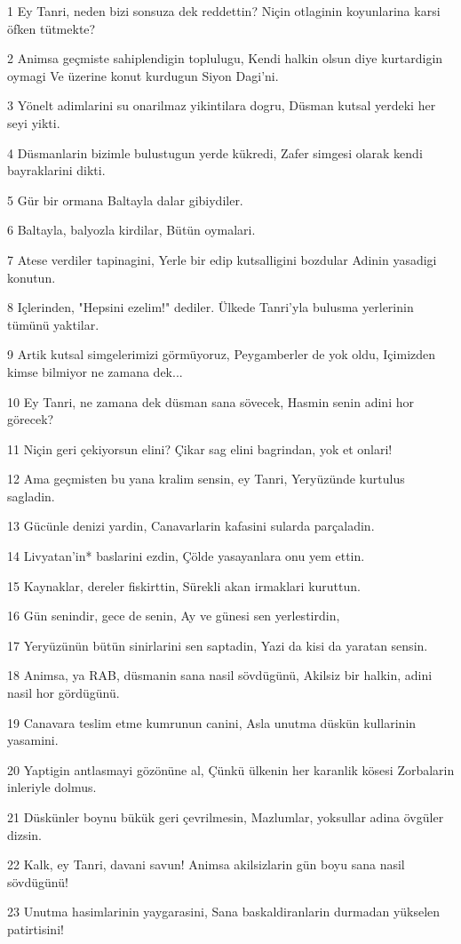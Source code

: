 \par 1 Ey Tanri, neden bizi sonsuza dek reddettin? Niçin otlaginin koyunlarina karsi öfken tütmekte?
\par 2 Animsa geçmiste sahiplendigin toplulugu, Kendi halkin olsun diye kurtardigin oymagi Ve üzerine konut kurdugun Siyon Dagi'ni.
\par 3 Yönelt adimlarini su onarilmaz yikintilara dogru, Düsman kutsal yerdeki her seyi yikti.
\par 4 Düsmanlarin bizimle bulustugun yerde kükredi, Zafer simgesi olarak kendi bayraklarini dikti.
\par 5 Gür bir ormana Baltayla dalar gibiydiler.
\par 6 Baltayla, balyozla kirdilar, Bütün oymalari.
\par 7 Atese verdiler tapinagini, Yerle bir edip kutsalligini bozdular Adinin yasadigi konutun.
\par 8 Içlerinden, "Hepsini ezelim!" dediler. Ülkede Tanri'yla bulusma yerlerinin tümünü yaktilar.
\par 9 Artik kutsal simgelerimizi görmüyoruz, Peygamberler de yok oldu, Içimizden kimse bilmiyor ne zamana dek...
\par 10 Ey Tanri, ne zamana dek düsman sana sövecek, Hasmin senin adini hor görecek?
\par 11 Niçin geri çekiyorsun elini? Çikar sag elini bagrindan, yok et onlari!
\par 12 Ama geçmisten bu yana kralim sensin, ey Tanri, Yeryüzünde kurtulus sagladin.
\par 13 Gücünle denizi yardin, Canavarlarin kafasini sularda parçaladin.
\par 14 Livyatan'in* baslarini ezdin, Çölde yasayanlara onu yem ettin.
\par 15 Kaynaklar, dereler fiskirttin, Sürekli akan irmaklari kuruttun.
\par 16 Gün senindir, gece de senin, Ay ve günesi sen yerlestirdin,
\par 17 Yeryüzünün bütün sinirlarini sen saptadin, Yazi da kisi da yaratan sensin.
\par 18 Animsa, ya RAB, düsmanin sana nasil sövdügünü, Akilsiz bir halkin, adini nasil hor gördügünü.
\par 19 Canavara teslim etme kumrunun canini, Asla unutma düskün kullarinin yasamini.
\par 20 Yaptigin antlasmayi gözönüne al, Çünkü ülkenin her karanlik kösesi Zorbalarin inleriyle dolmus.
\par 21 Düskünler boynu bükük geri çevrilmesin, Mazlumlar, yoksullar adina övgüler dizsin.
\par 22 Kalk, ey Tanri, davani savun! Animsa akilsizlarin gün boyu sana nasil sövdügünü!
\par 23 Unutma hasimlarinin yaygarasini, Sana baskaldiranlarin durmadan yükselen patirtisini!

